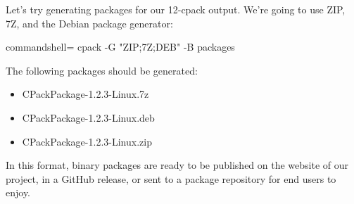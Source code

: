 Let's try generating packages for our 12-cpack output. We're going to use ZIP, 7Z, and the Debian package generator:

\begin{tcblisting}{commandshell={}}
cpack -G "ZIP;7Z;DEB" -B packages
\end{tcblisting}

The following packages should be generated:

\begin{itemize}
\item 
CPackPackage-1.2.3-Linux.7z

\item 
CPackPackage-1.2.3-Linux.deb

\item 
CPackPackage-1.2.3-Linux.zip
\end{itemize}

In this format, binary packages are ready to be published on the website of our project, in a GitHub release, or sent to a package repository for end users to enjoy.












